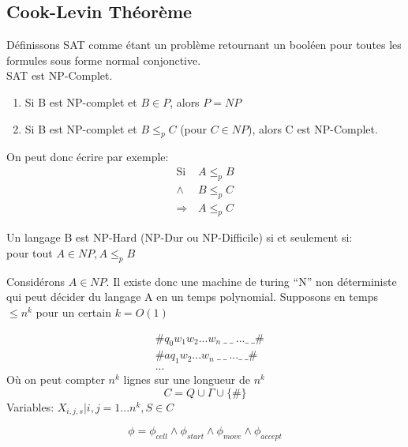 \documentclass[a4paper,12pt]{article}
\begin{document}
  \subsection{Cook-Levin Théorème}
    Définissons SAT comme étant un problème retournant un booléen pour toutes les formules sous forme normal conjonctive.\\
    SAT est NP-Complet.

    \begin{enumerate}
      \item Si B est NP-complet et $B \in P$, alors $P = NP$
      \item Si B est NP-complet et $B \leq_p C$ (pour $C \in NP$), alors C est NP-Complet.
    \end{enumerate}
    On peut donc écrire par exemple:
    \begin{align*}
      \text{Si } &A \leq_p B\\
      \wedge &B \leq_p C\\
      \Rightarrow &A \leq_p C
    \end{align*}


    \begin{defBox}
      Un langage B est NP-Hard (NP-Dur ou NP-Difficile) si et seulement si:\\
      pour tout $A \in NP, A \leq_p B$
    \end{defBox}
    Considérons $A \in NP$.  Il existe donc une machine de turing ``N'' non déterministe qui peut décider du langage A en un temps polynomial.  Supposons en temps $\leq n^k$ pour un certain $k = O(1)$

    \begin{align*}
      &\# q_0 w_1 w_2 ... w_n\ \_\ \_\ ... \_\ \_\#\\
      &\# a q_1 w_2 ... w_n\ \_\ \_\ ... \_\ \_\#\\
      &...
    \end{align*}
    Où on peut compter $n^k$ lignes sur une longueur de $n^k$\\
    $$C = Q \cup \Gamma \cup \{\#\}$$
    Variables: $X_{i, j, s} | i,j = 1...n^k, S \in C $

    $$\phi = \phi_{cell} \wedge \phi_{start} \wedge \phi_{move} \wedge \phi_{accept}$$
\end{document}
